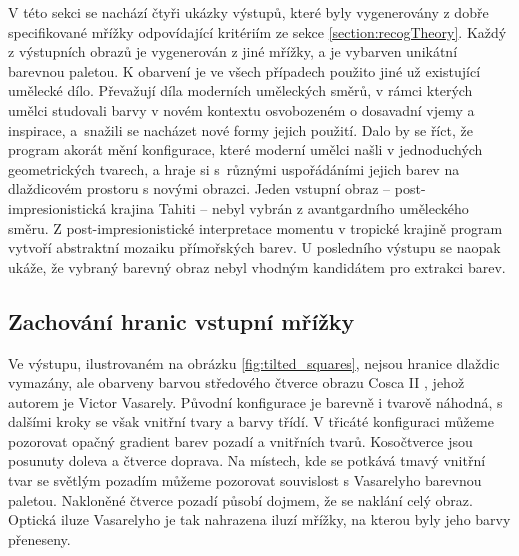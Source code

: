 V této sekci se nachází čtyři ukázky výstupů, které byly vygenerovány z dobře specifikované mřížky odpovídající kritériím ze sekce \ref{section:recogTheory}. Každý z výstupních obrazů je vygenerován z jiné mřížky, a je vybarven unikátní barevnou paletou. K obarvení je ve všech případech použito jiné už existující umělecké dílo. Převažují díla moderních uměleckých směrů, v rámci kterých umělci studovali barvy v novém kontextu osvobozeném o dosavadní vjemy a inspirace, a~snažili se nacházet nové formy jejich použití. Dalo by se říct, že program akorát mění konfigurace, které moderní umělci našli v jednoduchých geometrických tvarech, a hraje si s~různými uspořádáními jejich barev na dlaždicovém prostoru s novými obrazci. Jeden vstupní obraz -- post-impresionistická krajina Tahiti -- nebyl vybrán z avantgardního uměleckého směru. Z post-impresionistické interpretace momentu v tropické krajině program vytvoří abstraktní mozaiku přímořských barev. U posledního výstupu se naopak ukáže, že vybraný barevný obraz nebyl vhodným kandidátem pro extrakci barev.

\subsection*{Zachování hranic vstupní mřížky}

Ve výstupu, ilustrovaném na obrázku \ref{fig:tilted_squares}, nejsou hranice dlaždic vymazány, ale obarveny barvou středového čtverce obrazu Cosca II \cite{cosca2}, jehož autorem je Victor Vasarely. Původní konfigurace je barevně i tvarově náhodná, s dalšími kroky se však vnitřní tvary a barvy třídí. V třicáté konfiguraci můžeme pozorovat opačný gradient barev pozadí a vnitřních tvarů. Kosočtverce jsou posunuty doleva a čtverce doprava. Na místech, kde se potkává tmavý vnitřní tvar se světlým pozadím můžeme pozorovat souvislost s Vasarelyho barevnou paletou. Nakloněné čtverce pozadí působí dojmem, že se naklání celý obraz. Optická iluze Vasarelyho je tak nahrazena iluzí mřížky, na kterou byly jeho barvy přeneseny.

